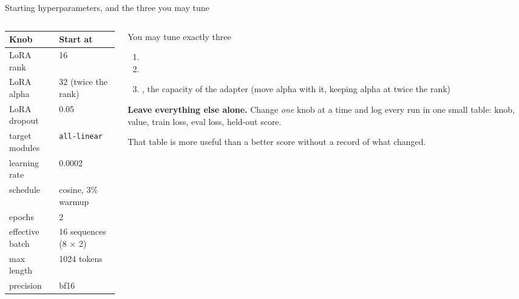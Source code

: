\documentclass[aspectratio=169,10pt]{beamer}
\begin{document}
\fi
\begin{frame}[shrink=9]{Starting hyperparameters, and the three you may tune}
  \begin{columns}[T]
    \begin{column}{0.52\textwidth}
      \small
      \begin{tabular}{@{}L{2.6cm} L{3.1cm}@{}}
        \toprule
        \textbf{Knob} & \textbf{Start at}\\
        \midrule
        LoRA rank & 16\\
        LoRA alpha & 32 (twice the rank)\\
        LoRA dropout & 0.05\\
        target modules & \texttt{all-linear}\\
        learning rate & 0.0002\\
        schedule & cosine, 3\% warmup\\
        epochs & 2\\
        effective batch & 16 sequences (8 $\times$ 2)\\
        max length & 1024 tokens\\
        precision & bf16\\
        \bottomrule
      \end{tabular}
    \end{column}
    \begin{column}{0.48\textwidth}
      \begin{block}{You may tune exactly three}
        \begin{enumerate}\small
          \item {}
          \item {}
          \item {}, the capacity of the adapter
            (move alpha with it, keeping alpha at twice the rank)
        \end{enumerate}
      \end{block}
      \vspace{0.3em}
      \small
      \textbf{Leave everything else alone.} Change \emph{one} knob at a time and
      log every run in one small table: knob, value, train loss, eval loss,
      held-out score.
      \vspace{0.4em}

      That table is more useful than a better score without a record of what
      changed.
    \end{column}
  \end{columns}
  \vspace{0.3em}
\end{frame}
\end{document}
